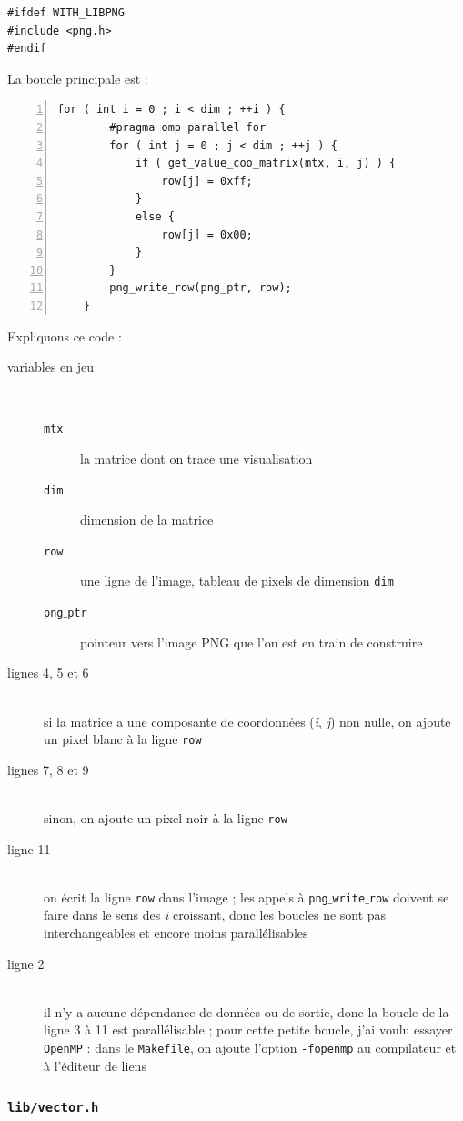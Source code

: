 \documentclass[a4paper,12pt]{article}
\begin{document}
\begin{lstlisting}
#ifdef WITH_LIBPNG
#include <png.h>
#endif
\end{lstlisting}
 La boucle principale est :
\begin{lstlisting}[numbers=left]
	for ( int i = 0 ; i < dim ; ++i ) {
		#pragma omp parallel for
		for ( int j = 0 ; j < dim ; ++j ) {
			if ( get_value_coo_matrix(mtx, i, j) ) {
				row[j] = 0xff;
			}
			else {
				row[j] = 0x00;
			}
		}
		png_write_row(png_ptr, row);
	}
\end{lstlisting}
Expliquons ce code : 
\begin{description}
  \item[variables en jeu]$ $
  \begin{description}
    \item[\texttt{mtx}]la matrice dont on trace une visualisation
    \item[\texttt{dim}]dimension de la matrice
    \item[\texttt{row}]une ligne de l'image, tableau de pixels de dimension \texttt{dim}
    \item[\texttt{png$\_$ptr}]pointeur vers l'image PNG que l'on est en train de construire
  \end{description}
  \item[lignes 4, 5 et 6]$ $\\si la matrice a une composante de coordonnées (\textit{i}, \textit{j}) non nulle, on ajoute un pixel blanc à la ligne \texttt{row}
  \item[lignes 7, 8 et 9]$ $\\sinon, on ajoute un pixel noir à la ligne \texttt{row}
  \item[ligne 11]$ $\\on écrit la ligne \texttt{row} dans l'image ; les appels à \texttt{png$\_$write$\_$row} doivent se faire dans le sens des \textit{i} croissant, donc les boucles ne sont pas interchangeables et encore moins parallélisables
  \item[ligne 2]$ $\\il n'y a aucune dépendance de données ou de sortie, donc la boucle de la ligne 3 à 11 est parallélisable ; pour cette petite boucle, j'ai voulu essayer \texttt{OpenMP} : dans le \texttt{Makefile}, on ajoute l'option \texttt{-fopenmp} au compilateur et à l'éditeur de liens
\end{description}


\subsubsection{\texttt{lib/vector.h}}
\end{document}
